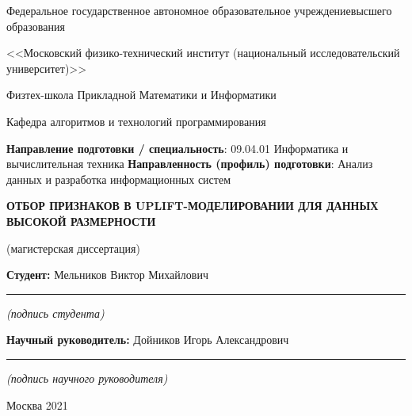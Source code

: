 \documentclass[14pt]{extarticle}
\renewcommand*{\maketitle}{
\begin{titlepage}
  \begin{center}
    \linespread{1}
    \small
    Федеральное государственное автономное образовательное учреждение\break высшего образования\par
    <<Московский физико-технический институт \break (национальный исследовательский университет)>>\par
    Физтех-школа Прикладной Математики и Информатики\par
    Кафедра алгоритмов и технологий программирования\par
  \end{center}
%
  {
    \small
    {\bf Направление подготовки / специальность}: 09.04.01 Информатика и вычислительная техника\newline
    {\bf Направленность (профиль) подготовки}: Анализ данных и разработка информационных систем
  }
%
  {
    \topskip0pt
    \vspace*{\fill}
    \begin{center}
      {
      	\bf\Large
      	ОТБОР ПРИЗНАКОВ В UPLIFT-МОДЕЛИРОВАНИИ\break
      	ДЛЯ ДАННЫХ ВЫСОКОЙ РАЗМЕРНОСТИ
      }\par
      (магистерская диссертация)
    \end{center}
    \vspace*{\fill}
  }
%
  \hfill
  \begin{minipage}[t]{8cm}
    {\bf Студент: \newline}
    Мельников Виктор Михайлович\newline
    \vspace{-3mm}
    \rule{8cm}{0.15mm}
    \centerline{\scriptsize\it (подпись студента)}\newline
%
    {\bf Научный руководитель: \newline}
    Дойников Игорь Александрович\newline
    \vspace{-3mm}
    \rule{8cm}{0.15mm}
    \centerline{\scriptsize\it (подпись научного руководителя)}
%
  \end{minipage}

    \vspace*{\fill}
    \begin{center}
      Москва 2021
    \end{center}
\end{titlepage}
}
\begin{document}
\maketitle

\newpage
\setcounter{page}{2}














\vspace*{\fill}
\begin{abstract}
Данная работа посвящена анализу различных методов отбора признаков в задачах uplift-моделирования в случае данных больших размерностей и их влияния на финальную модель. В качестве цели работы была выбрана имплементация специализированной библиотеки, в задачи которой входят: автоматический препроцессинг данных, отбор признаков несколькими способами, построение множества uplift-моделей различных типов и их комплексная аналитика. Такая библиотека представляет большой интерес для промышленного использования, поскольку аналогичных решений в открытом доступе обнаружено не было. В ходе работы был проведен подробный анализ работы методов отбора признаков на примере банковской задачи определения чувствительности клиентов к изменению ставки при рефинансировании кредитов наличными. Также было выявлено несколько дополнительных сложностей теоретического характера, которые могут стать основой для дальнейших исследований.
\end{abstract}
\vspace*{\fill}
















\newpage
\tableofcontents
\newpage










\newpage
\printbibliography
\end{document}
